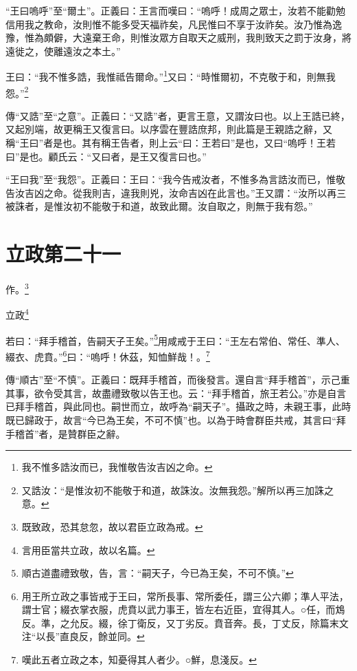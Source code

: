 {\noindent\shu{}\fzkt “王曰嗚呼”至“爾土”。正義曰：王言而嘆曰：“嗚呼！成周之眾士，汝若不能勸勉信用我之教命，汝則惟不能多受天福祚矣，凡民惟曰不享于汝祚矣。汝乃惟為逸豫，惟為頗僻，大遠棄王命，則惟汝眾方自取天之威刑，我則致天之罰于汝身，將遠徙之，使離遠汝之本土。” \par}

王曰：“我不惟多誥，我惟祗告爾命。”\footnote{我不惟多誥汝而已，我惟敬告汝吉凶之命。}又曰：“時惟爾初，不克敬于和，則無我怨。”\footnote{又誥汝：“是惟汝初不能敬于和道，故誅汝。汝無我怨。”解所以再三加誅之意。}


{\noindent\zhuan{}\fzbyks 傳“又誥”至“之意”。正義曰：“又誥”者，更言王意，又謂汝曰也。以上王誥已終，又起別端，故更稱王又復言曰。以序雲在豐誥庶邦，則此篇是王親誥之辭，又稱“王曰”者是也。其有稱王告者，則上云“曰：王若曰”是也，又曰“嗚呼！王若曰”是也。顧氏云：“又曰者，是王又復言曰也。” \par}

{\noindent\shu{}\fzkt “王曰我”至“我怨”。正義曰：王曰：“我今告戒汝者，不惟多為言誥汝而已，惟敬告汝吉凶之命。從我則吉，違我則兇，汝命吉凶在此言也。”王又謂：“汝所以再三被誅者，是惟汝初不能敬于和道，故致此爾。汝自取之，則無于我有怨。” \par}

\section{立政第二十一}


作。\footnote{既致政，恐其怠忽，故以君臣立政為戒。}

立政\footnote{言用臣當共立政，故以名篇。}

若曰：“拜手稽首，告嗣天子王矣。”\footnote{順古道盡禮致敬，告，言：“嗣天子，今已為王矣，不可不慎。”}用咸戒于王曰：“王左右常伯、常任、準人、綴衣、虎賁。”\footnote{用王所立政之事皆戒于王曰，常所長事、常所委任，謂三公六卿；準人平法，謂士官；綴衣掌衣服，虎賁以武力事王，皆左右近臣，宜得其人。○任，而鴆反。準，之允反。綴，徐丁衛反，又丁劣反。賁音奔。長，丁丈反，除篇末文注“以長”直良反，餘並同。}曰：“嗚呼！休茲，知恤鮮哉！。\footnote{嘆此五者立政之本，知憂得其人者少。○鮮，息淺反。}


{\noindent\zhuan{}\fzbyks 傳“順古”至“不慎”。正義曰：既拜手稽首，而後發言。還自言“拜手稽首”，示己重其事，欲令受其言，故盡禮致敬以告王也。云：“拜手稽首，旅王若公。”亦是自言已拜手稽首，與此同也。嗣世而立，故呼為“嗣天子”。攝政之時，未親王事，此時既已歸政于，故言“今已為王矣，不可不慎”也。以為于時會群臣共戒，其言曰“拜手稽首”者，是贊群臣之辭。 \par}

